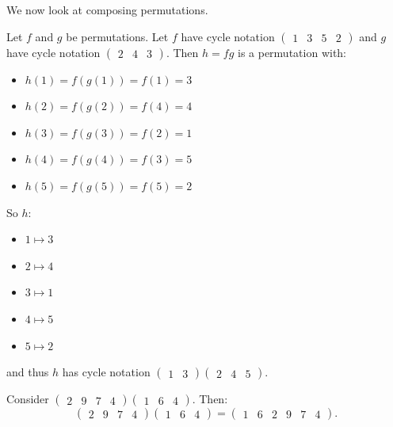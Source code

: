 We now look at composing permutations.
\begin{example}
    Let $f$ and $g$ be permutations. Let $f$ have cycle notation $\begin{pmatrix}1 & 3 & 5 & 2\end{pmatrix}$ and $g$ have cycle notation $\begin{pmatrix}2 & 4 & 3\end{pmatrix}$. Then $h = fg$ is a permutation with:
    \begin{itemize}
        \item $h(1) = f(g(1)) = f(1) = 3$
        \item $h(2) = f(g(2)) = f(4) = 4$
        \item $h(3) = f(g(3)) = f(2) = 1$
        \item $h(4) = f(g(4)) = f(3) = 5$
        \item $h(5) = f(g(5)) = f(5) = 2$
    \end{itemize}

    So $h$:
    \begin{itemize}
        \item $1 \mapsto 3$
        \item $2 \mapsto 4$
        \item $3 \mapsto 1$
        \item $4 \mapsto 5$
        \item $5 \mapsto 2$
    \end{itemize}
    and thus $h$ has cycle notation $\begin{pmatrix}1 & 3\end{pmatrix}\begin{pmatrix}2 & 4 & 5\end{pmatrix}$.
\end{example}

\begin{example}
    Consider $\begin{pmatrix}2 & 9 & 7 & 4\end{pmatrix}\begin{pmatrix}1 & 6 & 4\end{pmatrix}$. Then:
    \[\begin{pmatrix}2 & 9 & 7 & 4\end{pmatrix}\begin{pmatrix}1 & 6 & 4\end{pmatrix} = \begin{pmatrix}1 & 6 & 2 & 9 & 7 & 4\end{pmatrix}.\]
\end{example}


